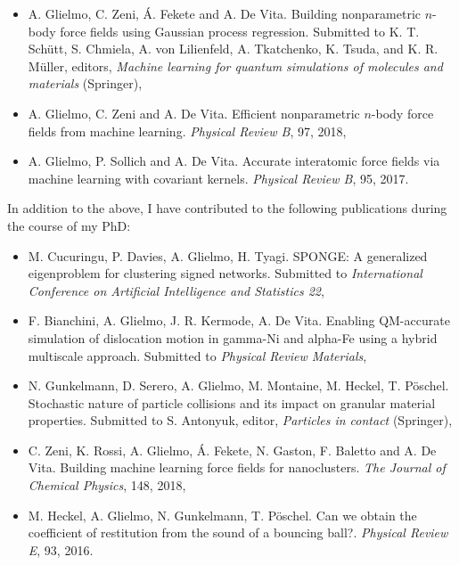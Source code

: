 \begin{itemize}
\item A. Glielmo, C. Zeni, \'A. Fekete and A. De Vita. Building nonparametric $n$-body force fields using Gaussian process regression. Submitted to K. T. Sch\"utt, S. Chmiela, A. von Lilienfeld, A. Tkatchenko, K. Tsuda, and K. R. M\"uller, editors, \emph{Machine learning for quantum simulations of molecules and materials} (Springer),
%
\item A. Glielmo, C. Zeni and A. De Vita. Efficient nonparametric $n$-body force fields from machine learning. \emph{Physical Review B}, 97, 2018,
%
\item A. Glielmo, P. Sollich and A. De Vita. Accurate interatomic force fields via machine learning with covariant kernels. \emph{Physical Review B}, 95, 2017.
%
\end{itemize}

\noindent In addition to the above, I have contributed to the following publications during the course of my PhD:

\begin{itemize}
%
\item M. Cucuringu, P. Davies, A. Glielmo, H. Tyagi. SPONGE: A generalized eigenproblem for clustering signed networks. Submitted to \emph{International Conference on Artificial Intelligence and Statistics 22},
%
\item F. Bianchini, A. Glielmo, J. R. Kermode, A. De Vita. Enabling QM-accurate simulation of dislocation motion in  gamma-Ni and  alpha-Fe using a hybrid multiscale approach. Submitted to \emph{Physical Review Materials},
%

\item N. Gunkelmann, D. Serero, A. Glielmo, M. Montaine, M. Heckel, T. P\"oschel. Stochastic nature of particle collisions and its impact on granular material properties. Submitted to S. Antonyuk, editor, \emph{Particles in contact} (Springer),
%

\item C. Zeni, K. Rossi, A. Glielmo, \'A. Fekete, N. Gaston, F. Baletto and A. De Vita. Building machine learning force fields for nanoclusters. \emph{The Journal of Chemical Physics}, 148, 2018,

\item M. Heckel, A. Glielmo, N. Gunkelmann, T. P\"oschel. Can we obtain the coefficient of restitution from the sound of a bouncing ball?. \emph{Physical Review E}, 93, 2016.
%
\end{itemize}
%



